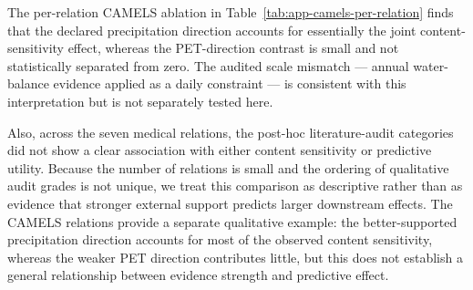 
The per-relation CAMELS ablation in
Table~\ref{tab:app-camels-per-relation} finds that the declared precipitation direction
accounts for essentially the joint content-sensitivity effect, whereas the PET-direction
contrast is small and not statistically separated from zero.
The audited scale mismatch — annual water-balance evidence applied as a daily constraint — is consistent with this interpretation but is not separately tested here.

Also, across the seven medical relations, the post-hoc literature-audit categories did not show a clear association with either content sensitivity or predictive utility.
Because the number of relations is small and the ordering of qualitative audit grades is not unique, we treat this comparison as descriptive rather than as evidence that stronger external support predicts larger downstream effects.
The CAMELS relations provide a separate qualitative example: the better-supported precipitation direction accounts for most of the observed content sensitivity, whereas the weaker PET direction contributes little, but this does not establish a general relationship between evidence strength and predictive effect.


